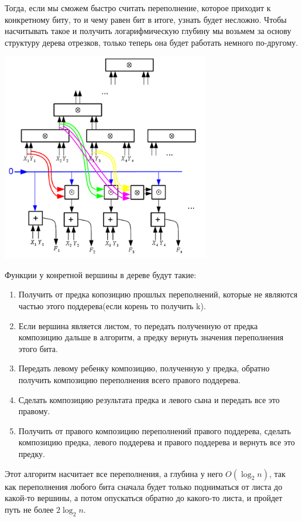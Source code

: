 \documentclass{article}
\begin{document}
Тогда, если мы сможем быстро считать переполнение, которое приходит к конкретному биту, то и чему равен бит в итоге, узнать будет несложно. Чтобы насчитывать такое и получить логарифмическую глубину мы возьмем за основу структуру дерева отрезков, только теперь она будет работать немного по-другому. 
\begin{center}
  \includegraphics[height=9.1cm]{summ.png}
\end{center}
Функции у конретной вершины в дереве будут такие:
\begin{enumerate}
    \item Получить от предка копозицию прошлых переполнений, которые не являются частью этого поддерева(если корень то получить k).
    \item Если вершина является листом, то передать полученную от предка композицию дальше в алгоритм, а предку вернуть значения переполнения этого бита.
    \item Передать левому ребенку композицию, полученную у предка, обратно получить композицию переполнения всего правого поддерева.
    \item Сделать композицию результата предка и левого сына и передать все это правому.
    \item Получить от правого композицию переполнений правого поддерева, сделать композицию предка, левого поддерева и правого поддерева и вернуть все это предку.
\end{enumerate}

Этот алгоритм насчитает все переполнения, а глубина у него $O(\log_2n)$, так как переполнения любого бита сначала будет только подниматься от листа до какой-то вершины, а потом опускаться обратно до какого-то листа, и пройдет путь не более $2\log_2n$.
\end{document}
